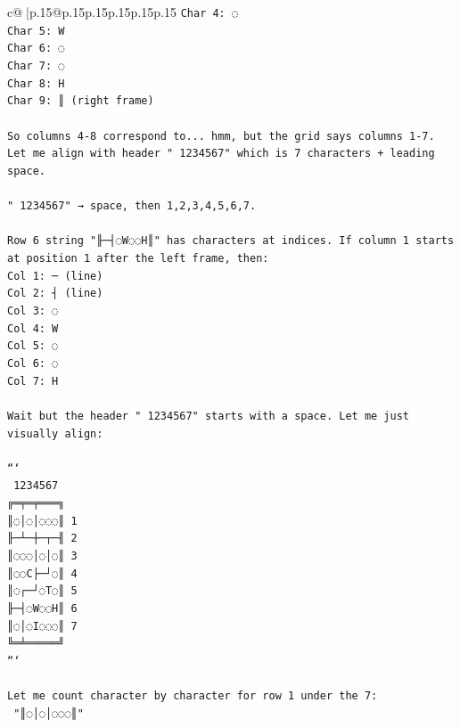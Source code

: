 \documentclass{article}
\begin{document}
{\begin{supertabular}{c@{$\;$}|p{.15\linewidth}@{}p{.15\linewidth}p{.15\linewidth}p{.15\linewidth}p{.15\linewidth}p{.15\linewidth}}
{{{\texttt{Char 4: ◌} \\
\texttt{Char 5: W} \\
\texttt{Char 6: ◌} \\
\texttt{Char 7: ◌} \\
\texttt{Char 8: H} \\
\texttt{Char 9: ║ (right frame)} \\
\\ 
\texttt{So columns 4{-}8 correspond to... hmm, but the grid says columns 1{-}7. Let me align with header " 1234567" which is 7 characters + leading space.} \\
\\ 
\texttt{" 1234567" → space, then 1,2,3,4,5,6,7.} \\
\\ 
\texttt{Row 6 string "╟─┤◌W◌◌H║" has characters at indices. If column 1 starts at position 1 after the left frame, then:} \\
\texttt{Col 1: ─ (line)} \\
\texttt{Col 2: ┤ (line)} \\
\texttt{Col 3: ◌} \\
\texttt{Col 4: W} \\
\texttt{Col 5: ◌} \\
\texttt{Col 6: ◌} \\
\texttt{Col 7: H} \\
\\ 
\texttt{Wait but the header " 1234567" starts with a space. Let me just visually align:} \\
\\ 
\texttt{```} \\
\texttt{ 1234567} \\
\texttt{╔═╤═╤═══╗} \\
\texttt{║◌│◌│◌◌◌║ 1} \\
\texttt{╟─┴─┼─┬─╢ 2} \\
\texttt{║◌◌◌│◌│◌║ 3} \\
\texttt{║◌◌C├─┘◌║ 4} \\
\texttt{║◌┌─┘◌T◌║ 5} \\
\texttt{╟─┤◌W◌◌H║ 6} \\
\texttt{║◌│◌I◌◌◌║ 7} \\
\texttt{╚═╧═════╝} \\
\texttt{```} \\
\\ 
\texttt{Let me count character by character for row 1 under the 7:} \\
\texttt{ "║◌│◌│◌◌◌║"} \\
}}}
\end{supertabular}}
\end{document}
